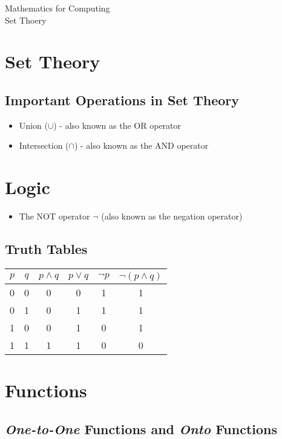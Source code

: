 \documentclass[12pt]{article}
\begin{document}
\begin{center}
\huge{Mathematics for Computing}\\
\LARGE{Set Thoery}
\end{center}


\section{Set Theory}
\subsection{Important Operations in Set Theory}
\begin{itemize}
\item Union ($\cup$) - also known as the OR operator
\item Intersection ($\cap$) - also known as the AND operator
\end{itemize}

\section{Logic}
\begin{itemize}
\item The NOT operator $\neg$ (also known as the negation operator)
\end{itemize}
\subsection{Truth Tables}
{
\Large
\begin{center}
\begin{tabular}{|c|c||c|c||c|c|}
\hline $p$ & $q$ & $p \wedge q$ & $p\vee q$ & $\neg p$  & $\neg (p \wedge q)$ \\ 
\hline 0 & 0 & 0 & 0 & 1 & 1 \\ 
\hline 0 & 1 & 0 & 1 & 1 & 1 \\ 
\hline 1 & 0 & 0 & 1 & 0 & 1 \\ 
\hline 1 & 1 & 1 & 1 & 0 & 0 \\ 
\hline 
\end{tabular} 
\end{center}
}


\newpage
\section{Functions}

\subsection{\textit{One-to-One} Functions and \textit{Onto} Functions}
\end{document}
